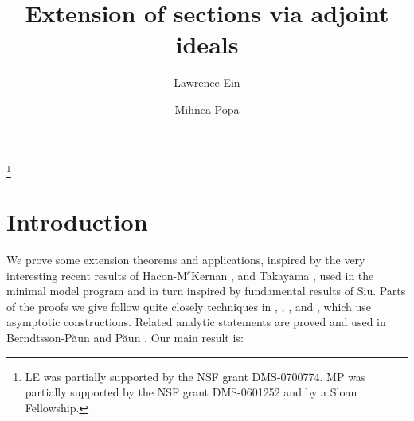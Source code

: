\documentclass[11pt]{amsart}
\theoremstyle{plain}
\theoremstyle{definition}
\begin{document}
\title{Extension of sections via adjoint ideals}

\author[L. Ein]{Lawrence Ein}
\address{Department of Mathematics \\ University of
Illinois at Chicago, \hfil\break{} South
Morgan Street (M/C 249)\\ Chicago, IL 60607-7045, USA}

\author[M. Popa]{Mihnea Popa}
\address{Department of Mathematics \\ University of
Illinois at Chicago, \hfil\break{} South
Morgan Street (M/C 249)\\ Chicago, IL 60607-7045, USA}

\thanks{LE was partially supported by the NSF grant DMS-0700774. MP was partially supported by the NSF grant DMS-0601252 and by a Sloan Fellowship.}

\maketitle


\section{Introduction}

We prove some extension theorems and applications, inspired by the very interesting recent results of Hacon-M$^c$Kernan \cite{hm1}, \cite{hm2} and Takayama \cite{takayama}, used in the minimal model program and in turn inspired by fundamental results of Siu. Parts of the proofs we give follow quite closely techniques in \cite{kawamata}, \cite{hm1}, \cite{hm2}, and \cite{positivity}, which use asymptotic constructions. Related analytic statements are proved and used in Berndtsson-P\u aun \cite{bp} and 
P\u aun \cite{paun2}. Our main result is:
\end{document}
